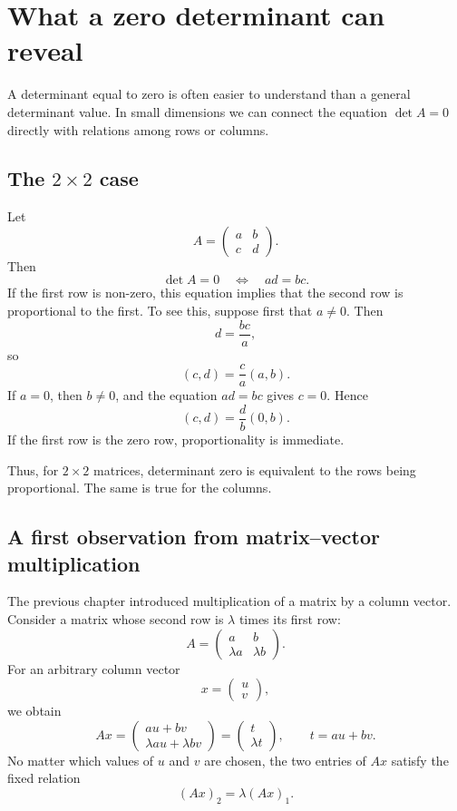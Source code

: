 \section{What a zero determinant can reveal}

A determinant equal to zero is often easier to understand than a general determinant value. In small dimensions we can connect the equation \(\det A=0\) directly with relations among rows or columns.

\subsection{The \(2\times2\) case}

Let
\[
A=\begin{pmatrix}a&b\\c&d\end{pmatrix}.
\]
Then
\[
\det A=0
\quad\Longleftrightarrow\quad
ad=bc.
\]
If the first row is non-zero, this equation implies that the second row is proportional to the first. To see this, suppose first that \(a\ne0\). Then
\[
d=\frac{bc}{a},
\]
so
\[
(c,d)=\frac{c}{a}(a,b).
\]
If \(a=0\), then \(b\ne0\), and the equation \(ad=bc\) gives \(c=0\). Hence
\[
(c,d)=\frac{d}{b}(0,b).
\]
If the first row is the zero row, proportionality is immediate.

Thus, for \(2\times2\) matrices, determinant zero is equivalent to the rows being proportional. The same is true for the columns.

\subsection{A first observation from matrix--vector multiplication}

The previous chapter introduced multiplication of a matrix by a column vector. Consider a matrix whose second row is \(\lambda\) times its first row:
\[
A=
\begin{pmatrix}
a&b\\
\lambda a&\lambda b
\end{pmatrix}.
\]
For an arbitrary column vector
\[
x=\begin{pmatrix}u\\v\end{pmatrix},
\]
we obtain
\[
Ax=
\begin{pmatrix}
au+bv\\
\lambda au+\lambda bv
\end{pmatrix}
=
\begin{pmatrix}
t\\
\lambda t
\end{pmatrix},
\qquad t=au+bv.
\]
No matter which values of \(u\) and \(v\) are chosen, the two entries of \(Ax\) satisfy the fixed relation
\[
(Ax)_2=\lambda(Ax)_1.
\]

